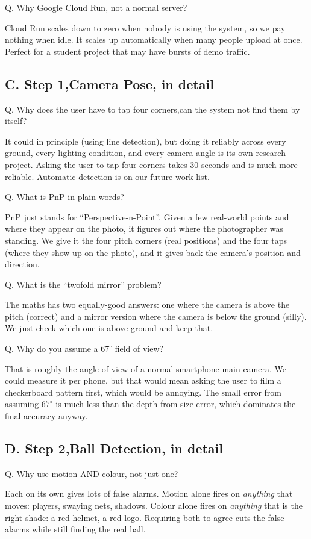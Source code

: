 \documentclass[11pt,a4paper]{article}
\newcommand{\qa}[2]{%
  \par\vspace{8pt}%
  \noindent
  \colorbox{NavyTint}{%
    \begin{minipage}{\dimexpr\textwidth-2\fboxsep\relax}%
      \color{white}\bfseries\strut Q. #1%
    \end{minipage}%
  }\par\nobreak
  \noindent
  \colorbox{MutedBg}{%
    \begin{minipage}{\dimexpr\textwidth-2\fboxsep\relax}%
      \color{black}\setlength{\parskip}{4pt}\strut #2\strut%
    \end{minipage}%
  }%
  \par\vspace{6pt}%
}
\begin{document}
\qa{Why Google Cloud Run, not a normal server?}{%
Cloud Run scales down to zero when nobody is using the system, so we pay nothing when idle. It scales up automatically when many people upload at once. Perfect for a student project that may have bursts of demo traffic.}

\subsection{C. Step 1,Camera Pose, in detail}

\qa{Why does the user have to tap four corners,can the system not find them by itself?}{%
It could in principle (using line detection), but doing it reliably across every ground, every lighting condition, and every camera angle is its own research project. Asking the user to tap four corners takes 30 seconds and is much more reliable. Automatic detection is on our future-work list.}

\qa{What is PnP in plain words?}{%
PnP just stands for ``Perspective-n-Point''. Given a few real-world points and where they appear on the photo, it figures out where the photographer was standing. We give it the four pitch corners (real positions) and the four taps (where they show up on the photo), and it gives back the camera's position and direction.}

\qa{What is the ``twofold mirror'' problem?}{%
The maths has two equally-good answers: one where the camera is above the pitch (correct) and a mirror version where the camera is below the ground (silly). We just check which one is above ground and keep that.}

\qa{Why do you assume a $67^\circ$ field of view?}{%
That is roughly the angle of view of a normal smartphone main camera. We could measure it per phone, but that would mean asking the user to film a checkerboard pattern first, which would be annoying. The small error from assuming $67^\circ$ is much less than the depth-from-size error, which dominates the final accuracy anyway.}

\subsection{D. Step 2,Ball Detection, in detail}

\qa{Why use motion AND colour, not just one?}{%
Each on its own gives lots of false alarms. Motion alone fires on \emph{anything} that moves: players, swaying nets, shadows. Colour alone fires on \emph{anything} that is the right shade: a red helmet, a red logo. Requiring both to agree cuts the false alarms while still finding the real ball.}
\end{document}
